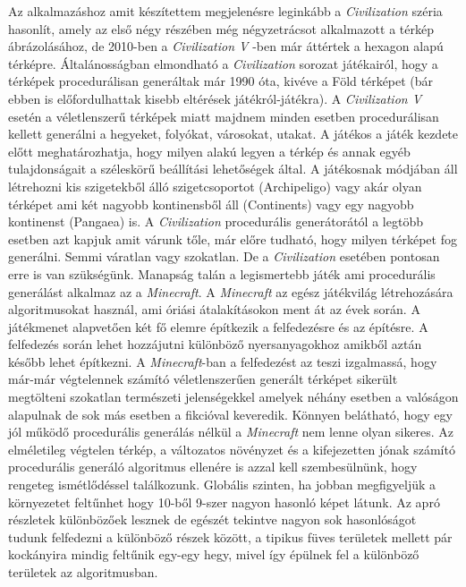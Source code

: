 \newline Az alkalmazáshoz amit készítettem megjelenésre leginkább a \textit{Civilization} széria hasonlít, amely az első négy részében még négyzetrácsot alkalmazott a térkép ábrázolásához, de 2010-ben a \textit{Civilization V} -ben már áttértek a hexagon alapú térképre. Általánosságban elmondható a \textit{Civilization} sorozat játékairól, hogy a térképek procedurálisan generáltak már 1990 óta, kivéve a Föld térképet (bár ebben is előfordulhattak kisebb eltérések játékról-játékra). A \textit{Civilization V} esetén a véletlenszerű térképek miatt majdnem minden esetben procedurálisan kellett generálni a hegyeket, folyókat, városokat, utakat. A játékos a játék kezdete előtt meghatározhatja, hogy milyen alakú legyen a térkép és annak egyéb tulajdonságait a széleskörű beállítási lehetőségek által. A játékosnak módjában áll létrehozni kis szigetekből álló szigetcsoportot (Archipeligo) vagy akár olyan térképet ami két nagyobb kontinensből áll (Continents) vagy egy nagyobb kontinenst (Pangaea) is. A \textit{Civilization} procedurális generátorától a legtöbb esetben azt kapjuk amit várunk tőle, már előre tudható, hogy milyen térképet fog generálni. Semmi váratlan vagy szokatlan. De a \textit{Civilization} esetében pontosan erre is van szükségünk.
\newline
\newline Manapság talán a legismertebb játék ami procedurális generálást alkalmaz az a \textit{Minecraft}. A \textit{Minecraft} az egész játékvilág létrehozására algoritmusokat használ, ami óriási átalakításokon ment át az évek során. A játékmenet alapvetően két fő elemre építkezik a felfedezésre és az építésre. A felfedezés során lehet hozzájutni különböző nyersanyagokhoz amikből aztán később lehet építkezni. A \textit{Minecraft}-ban a felfedezést az teszi izgalmassá, hogy már-már végtelennek számító véletlenszerűen generált térképet sikerült megtölteni szokatlan természeti jelenségekkel amelyek néhány esetben a valóságon alapulnak de sok más esetben a fikcióval keveredik. Könnyen belátható, hogy egy jól működő procedurális generálás nélkül a \textit{Minecraft} nem lenne olyan sikeres. Az elméletileg végtelen térkép, a változatos növényzet és a kifejezetten jónak számító procedurális generáló algoritmus ellenére is azzal kell szembesülnünk, hogy rengeteg ismétlődéssel találkozunk. Globális szinten, ha jobban megfigyeljük a környezetet feltűnhet hogy 10-ből 9-szer nagyon hasonló képet látunk. Az apró részletek különbözőek lesznek de egészét tekintve nagyon sok hasonlóságot tudunk felfedezni a különböző részek között, a tipikus füves területek mellett pár kockányira mindig feltűnik egy-egy hegy, mivel így épülnek fel a különböző területek az algoritmusban. 

